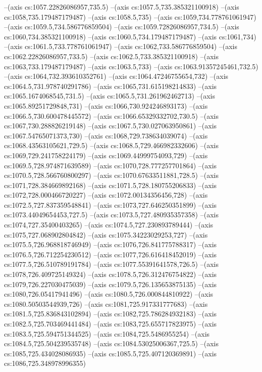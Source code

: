 --(axis cs:1057.22826086957,735.5)
--(axis cs:1057.5,735.385321100918)
--(axis cs:1058,735.179487179487)
--(axis cs:1058.5,735)
--(axis cs:1059,734.778761061947)
--(axis cs:1059.5,734.586776859504)
--(axis cs:1059.72826086957,734.5)
--(axis cs:1060,734.385321100918)
--(axis cs:1060.5,734.179487179487)
--(axis cs:1061,734)
--(axis cs:1061.5,733.778761061947)
--(axis cs:1062,733.586776859504)
--(axis cs:1062.22826086957,733.5)
--(axis cs:1062.5,733.385321100918)
--(axis cs:1063,733.179487179487)
--(axis cs:1063.5,733)
--(axis cs:1063.91357245461,732.5)
--(axis cs:1064,732.393610352761)
--(axis cs:1064.47246755654,732)
--(axis cs:1064.5,731.978740291786)
--(axis cs:1065,731.615198214833)
--(axis cs:1065.1674068545,731.5)
--(axis cs:1065.5,731.261962462713)
--(axis cs:1065.89251729848,731)
--(axis cs:1066,730.924246893173)
--(axis cs:1066.5,730.600478445572)
--(axis cs:1066.65329332702,730.5)
--(axis cs:1067,730.288826219148)
--(axis cs:1067.5,730.027063950861)
--(axis cs:1067.54765071373,730)
--(axis cs:1068,729.738634039074)
--(axis cs:1068.43563105621,729.5)
--(axis cs:1068.5,729.466982332606)
--(axis cs:1069,729.241758224179)
--(axis cs:1069.44999754093,729)
--(axis cs:1069.5,728.974871639589)
--(axis cs:1070,728.777257701864)
--(axis cs:1070.5,728.566760800297)
--(axis cs:1070.67633511881,728.5)
--(axis cs:1071,728.384669892168)
--(axis cs:1071.5,728.180755206833)
--(axis cs:1072,728.000466720227)
--(axis cs:1072.00134356456,728)
--(axis cs:1072.5,727.837359548841)
--(axis cs:1073,727.646250351899)
--(axis cs:1073.44049654453,727.5)
--(axis cs:1073.5,727.480935357358)
--(axis cs:1074,727.35400403265)
--(axis cs:1074.5,727.230893789444)
--(axis cs:1075,727.068902804842)
--(axis cs:1075.34223029253,727)
--(axis cs:1075.5,726.968818746949)
--(axis cs:1076,726.841775788317)
--(axis cs:1076.5,726.712254230512)
--(axis cs:1077,726.616418452019)
--(axis cs:1077.5,726.510789191784)
--(axis cs:1077.55391641578,726.5)
--(axis cs:1078,726.409725149324)
--(axis cs:1078.5,726.312476754822)
--(axis cs:1079,726.227030475039)
--(axis cs:1079.5,726.135653875135)
--(axis cs:1080,726.05417941496)
--(axis cs:1080.5,726.000844810922)
--(axis cs:1080.50503544939,726)
--(axis cs:1081,725.917331777683)
--(axis cs:1081.5,725.836843102894)
--(axis cs:1082,725.786284932183)
--(axis cs:1082.5,725.703469441484)
--(axis cs:1083,725.655717823975)
--(axis cs:1083.5,725.594751344525)
--(axis cs:1084,725.5486955254)
--(axis cs:1084.5,725.504239535748)
--(axis cs:1084.53025006367,725.5)
--(axis cs:1085,725.434028086935)
--(axis cs:1085.5,725.407120369891)
--(axis cs:1086,725.348978996355)

